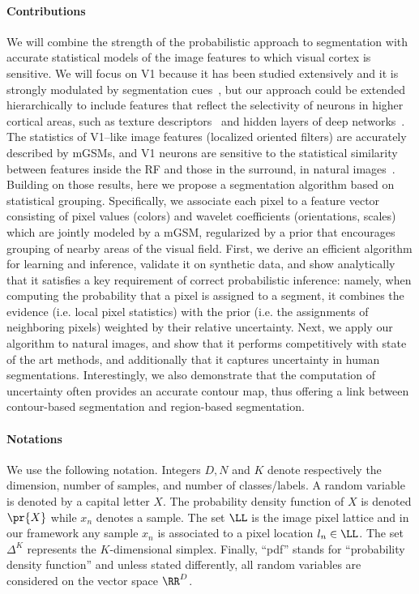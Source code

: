\documentclass[a4paper,12pt]{article}
\begin{document}
\paragraph{Contributions} We will combine the strength of the probabilistic approach to segmentation with accurate statistical models of the image features to which visual cortex is sensitive. We will focus on V1 because it has been studied extensively and it is strongly modulated by segmentation cues~\cite{slllito1995visual}, but our approach could be extended hierarchically to include features that reflect the selectivity of neurons in higher cortical areas, such as texture descriptors~\cite{freeman2013functional} and hidden layers of deep networks~\cite{yamins2014performance}. The statistics of V1--like image features (localized oriented filters) are accurately described by mGSMs, and V1 neurons are sensitive to the statistical similarity between features inside the RF and those in the surround, in natural images~\cite{coen2015flexible}. Building on those results, here we propose a segmentation algorithm based on statistical grouping. Specifically, we associate each pixel to a feature vector consisting of pixel values (colors) and wavelet coefficients (orientations, scales) which are jointly modeled by a mGSM, regularized by a prior that encourages grouping of nearby areas of the visual field. First, we derive an efficient algorithm for learning and inference, validate it on synthetic data, and show analytically that it satisfies a key requirement of correct probabilistic inference: namely, when computing the probability that a pixel is assigned to a segment, it combines the evidence (i.e. local pixel statistics) with the prior (i.e. the assignments of neighboring pixels) weighted by their relative uncertainty. Next, we apply our algorithm to natural images, and show that it performs competitively with state of the art methods, and additionally that it captures uncertainty in human segmentations. Interestingly, we also demonstrate that the computation of uncertainty often provides an accurate contour map, thus offering a link between contour-based segmentation and region-based segmentation. %

\paragraph{Notations} We use the following notation. Integers $D, N$ and $K$ denote respectively the dimension, number of samples, and number of classes/labels. A random variable is denoted by a capital letter $X$. The probability density function of $X$ is denoted $\pr{X}$ while $x_n$ denotes a sample. The set $\LL$ is the image pixel lattice and in our framework any sample $x_n$ is associated to a pixel location $l_n \in \LL$. The set $\Delta^K$ represents the $K$-dimensional simplex. Finally, ``pdf'' stands for ``probability density function'' and unless stated differently, all random variables are considered on the vector space $\RR^D$.
\end{document}
